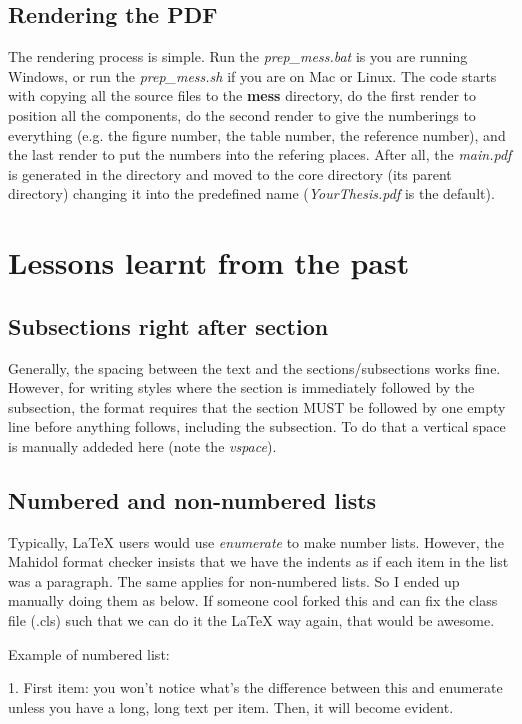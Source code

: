 \subsection{Rendering the PDF} \label{use:render}
The rendering process is simple. Run the \textit{prep\_mess.bat} is you are running Windows, or run the \textit{prep\_mess.sh} if you are on Mac or Linux. The code starts with copying all the source files to the \textbf{mess} directory, do the first render to position all the components, do the second render to give the numberings to everything (e.g. the figure number, the table number, the reference number), and the last render to put the numbers into the refering places. After all, the \textit{main.pdf} is generated in the directory and moved to the core directory (its parent directory) changing it into the predefined name (\textit{YourThesis.pdf} is the default).



\section{Lessons learnt from the past}
\vspace{4.7ex}
\subsection{Subsections right after section}
Generally, the spacing between the text and the sections/subsections works fine.
However, for writing styles where the section is immediately followed by the subsection, the format requires that the section MUST be followed by one empty line before anything follows, including the subsection.
To do that a vertical space is manually addeded here (note the \textit{vspace}).


\subsection{Numbered and non-numbered lists}
Typically, LaTeX users would use \textit{enumerate} to make number lists. However, the Mahidol format checker insists that we have the indents as if each item in the list was a paragraph. The same applies for non-numbered lists. So I ended up manually doing them as below. If someone cool forked this and can fix the class file (.cls) such that we can do it the LaTeX way again, that would be awesome.

Example of numbered list:

1. First item: you won't notice what's the difference between this and enumerate unless you have a long, long text per item. Then, it will become evident.

